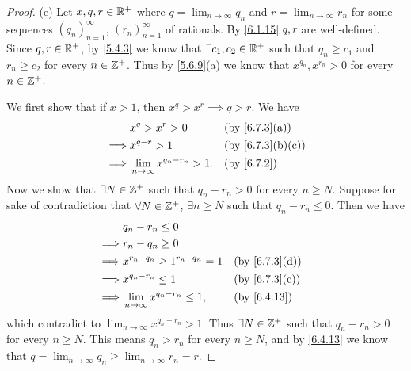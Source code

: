 \begin{proof}{(e)}
  Let \(x, q, r \in \mathbb{R}^+\) where \(q = \lim_{n \to \infty} q_n\) and \(r = \lim_{n \to \infty} r_n\) for some sequences \((q_n)_{n = 1}^\infty\), \((r_n)_{n = 1}^\infty\) of rationals.
  By \cref{6.1.15} \(q, r\) are well-defined.
  Since \(q, r \in \mathbb{R}^+\), by \cref{5.4.3} we know that \(\exists c_1, c_2 \in \mathbb{R}^+\) such that \(q_n \geq c_1\) and \(r_n \geq c_2\) for every \(n \in \mathbb{Z}^+\).
  Thus by \cref{5.6.9}(a) we know that \(x^{q_n}, x^{r_n} > 0\) for every \(n \in \mathbb{Z}^+\).

  We first show that if \(x > 1\), then \(x^q > x^r \implies q > r\).
  We have
  \begin{align*}
             & x^q > x^r > 0                          &  & \text{(by \cref{6.7.3}(a))}    \\
    \implies & x^{q - r} > 1                          &  & \text{(by \cref{6.7.3}(b)(c))} \\
    \implies & \lim_{n \to \infty} x^{q_n - r_n} > 1. &  & \by{6.7.2}                     \\
  \end{align*}
  Now we show that \(\exists N \in \mathbb{Z}^+\) such that \(q_n - r_n > 0\) for every \(n \geq N\).
  Suppose for sake of contradiction that \(\forall N \in \mathbb{Z}^+\), \(\exists n \geq N\) such that \(q_n - r_n \leq 0\).
  Then we have
  \begin{align*}
             & q_n - r_n \leq 0                                                           \\
    \implies & r_n - q_n \geq 0                                                           \\
    \implies & x^{r_n - q_n} \geq 1^{r_n - q_n} = 1      &  & \text{(by \cref{6.7.3}(d))} \\
    \implies & x^{q_n - r_n} \leq 1                      &  & \text{(by \cref{6.7.3}(c))} \\
    \implies & \lim_{n \to \infty} x^{q_n - r_n} \leq 1, &  & \by{6.4.13}
  \end{align*}
  which contradict to \(\lim_{n \to \infty} x^{q_n - r_n} > 1\).
  Thus \(\exists N \in \mathbb{Z}^+\) such that \(q_n - r_n > 0\) for every \(n \geq N\).
  This means \(q_n > r_n\) for every \(n \geq N\), and by \cref{6.4.13} we know that \(q = \lim_{n \to \infty} q_n \geq \lim_{n \to \infty} r_n = r\).


\end{proof}
